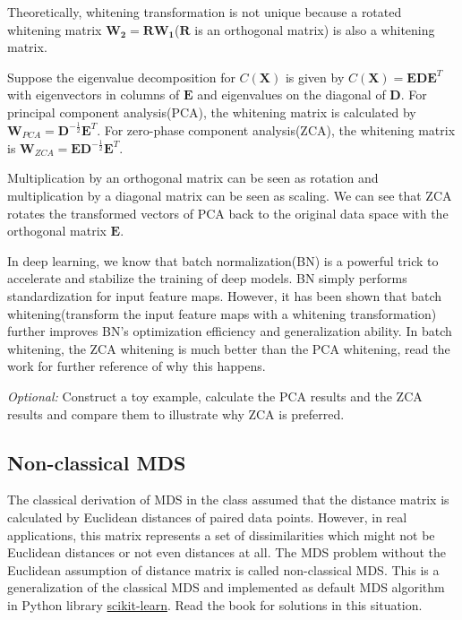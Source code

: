 \documentclass[UTF-8]{ctexart}
\theoremstyle{definition}
\theoremstyle{definition}
\theoremstyle{remark}
\begin{document}
Theoretically, whitening transformation is not unique because a rotated whitening matrix $\mathbf{W_2} = \mathbf{R} \mathbf{W_1}$($\mathbf{R}$ is an orthogonal matrix) is also a whitening matrix. 

Suppose the eigenvalue decomposition for $C(\mathbf{X})$ is given by $C(\mathbf{X}) = \mathbf{E} \mathbf{D} \mathbf{E}^T$ with eigenvectors in columns of $\mathbf{E}$ and eigenvalues on the diagonal of $\mathbf{D}$. For principal component analysis(PCA), the whitening matrix is calculated by $\mathbf{W}_{PCA} = \mathbf{D}^{-\frac{1}{2}} \mathbf{E}^T$. For zero-phase component analysis(ZCA), the whitening matrix is $\mathbf{W}_{ZCA} = \mathbf{E} \mathbf{D}^{-\frac{1}{2}} \mathbf{E}^T$.

Multiplication by an orthogonal matrix can be seen as rotation and multiplication by a diagonal matrix can be seen as scaling. We can see that ZCA rotates the transformed vectors of PCA back to the original data space with the orthogonal matrix $\mathbf{E}$.

In deep learning, we know that batch normalization(BN) is a powerful trick to accelerate and stabilize the training of deep models. BN simply performs standardization for input feature maps. However, it has been shown that batch whitening(transform the input feature maps with a whitening transformation) further improves BN's optimization efficiency and generalization ability\cite{batch_whitening}. In batch whitening, the ZCA whitening is much better than the PCA whitening, read the work\cite{batch_whitening} for further reference of why this happens.

\emph{Optional:} Construct a toy example, calculate the PCA results and the ZCA results and compare them to illustrate why ZCA is preferred.


\subsection*{Non-classical MDS}

The classical derivation of MDS in the class assumed that the distance matrix is calculated by Euclidean distances of paired data points. However, in real applications, this matrix represents a set of dissimilarities which might not be Euclidean distances or not even distances at all. The MDS problem without the Euclidean assumption of distance matrix is called non-classical MDS. This is a generalization of the classical MDS and implemented as default MDS algorithm in Python library \href{https://scikit-learn.org/stable/modules/manifold.html#multidimensional-scaling}{scikit-learn}. Read the book\cite{MDS} for solutions in this situation.
\end{document}
